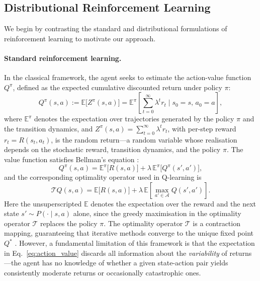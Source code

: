 \documentclass[11pt]{article}
\begin{document}
\subsection*{Distributional Reinforcement Learning}

We begin by contrasting the standard and distributional formulations of reinforcement learning to motivate our approach.
 
\paragraph{Standard reinforcement learning.}
In the classical framework, the agent seeks to estimate the action-value function $Q^\pi$, defined as the expected cumulative discounted return under policy $\pi$:
\begin{equation}\label{eq:action_value}
    Q^\pi(s,a) := \mathbb{E}\bigl[Z^\pi(s,a)\bigr] 
    = \mathbb{E}^{\pi}\!\left[\sum_{t=0}^{\infty} \lambda^t r_t \;\bigg|\; s_0 = s,\, a_0 = a\right],
\end{equation}
where $\mathbb{E}^{\pi}$ denotes the expectation over trajectories generated by the policy $\pi$ and the transition dynamics, and $Z^\pi(s,a) = \sum_{t=0}^{\infty} \lambda^t r_t$, with per-step reward $r_t = R(s_t, a_t)$, is the random return---a random variable whose realisation depends on the stochastic reward, transition dynamics, and the policy $\pi$. The value function satisfies Bellman's equation \citet{bellman1957dynamic}:
\begin{equation}\label{eq:bellman_expectation}
    Q^\pi(s,a) = \mathbb{E}^{\pi}\bigl[R(s,a)\bigr] + \lambda\, \mathbb{E}^{\pi}\bigl[Q^\pi(s', a')\bigr],
\end{equation}
and the corresponding optimality operator used in Q-learning is
\begin{equation}\label{eq:bellman_optimality}
    \mathcal{T} Q(s,a) = \mathbb{E}\bigl[R(s,a)\bigr] + \lambda\, \mathbb{E}\!\left[\max_{a' \in \mathcal{A}} Q(s', a')\right].
\end{equation}
Here the unsuperscripted $\mathbb{E}$ denotes the expectation over the reward and the next state $s' \sim P(\cdot \mid s, a)$ alone, since the greedy maximisation in the optimality operator $\mathcal{T}$ replaces the policy $\pi$. The optimality operator $\mathcal{T}$ is a contraction mapping, guaranteeing that iterative methods converge to the unique fixed point $Q^*$ \citet{bertsekas1996neuro}. However, a fundamental limitation of this framework is that the expectation in Eq.~\eqref{eq:action_value} discards all information about the \emph{variability} of returns---the agent has no knowledge of whether a given state-action pair yields consistently moderate returns or occasionally catastrophic ones.
 
\end{document}
